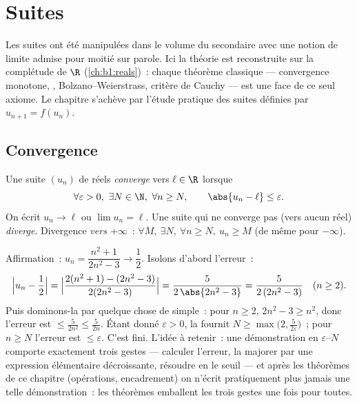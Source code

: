 \chapter{Suites}\label{ch:b1:seq}

Les suites ont été manipulées dans le volume du secondaire avec
une notion de limite admise pour moitié sur parole. Ici la théorie est
reconstruite sur la complétude de $\R$ (\cref{ch:b1:reals})~: chaque
théorème classique --- convergence monotone, ,
Bolzano--Weierstrass, critère de Cauchy --- est une face de ce seul
axiome. Le chapitre s'achève par l'étude pratique des suites définies
par $u_{n+1} = f(u_n)$.

\section{Convergence}

\begin{definition}\label{def:b1:seq:limit}
Une suite $(u_n)$ de réels \emph{converge} vers $\ell \in \R$
lorsque
\[
\forall \varepsilon > 0,\ \exists N \in \N,\ \forall n \geq N,
\qquad \abs{u_n - \ell} \leq \varepsilon .
\]
On écrit $u_n \to \ell$ ou $\lim u_n = \ell$. Une suite qui ne
converge pas (vers aucun réel) \emph{diverge}. Divergence \emph{vers
$+\infty$}~: $\forall M,\ \exists N,\ \forall n \geq N,\ u_n \geq M$
(de même pour $-\infty$).
\end{definition}

\begin{example}\label{ex:b1:seq:epsilonN}
Affirmation~: $u_n = \dfrac{n^2 + 1}{2n^2 - 3} \to \dfrac12$.
Isolons d'abord l'erreur~:
\[
\Bigl| u_n - \frac12 \Bigr|
= \Bigl| \frac{2(n^2 + 1) - (2n^2 - 3)}{2(2n^2 - 3)} \Bigr|
= \frac{5}{2\,\abs{2n^2 - 3}}
= \frac{5}{2\,(2n^2 - 3)} \quad (n \geq 2).
\]
Puis dominons-la par quelque chose de simple~: pour $n \geq 2$, $2n^2
- 3 \geq n^2$, donc l'erreur est $\leq \frac{5}{2n^2} \leq \frac
5{2n}$. Étant donné $\varepsilon > 0$, la 
fournit $N \geq \max\bigl(2, \frac{5}{2\varepsilon}\bigr)$~; pour $n
\geq N$ l'erreur est $\leq \varepsilon$. C'est fini. L'idée à
retenir~: une démonstration en $\varepsilon$--$N$ comporte exactement
trois gestes --- calculer l'erreur, la majorer par une expression
élémentaire décroissante, résoudre en le seuil --- et après les
théorèmes de ce chapitre (opérations, encadrement) on n'écrit
pratiquement plus jamais une telle démonstration~: les théorèmes
emballent les trois gestes une fois pour toutes.
\end{example}

